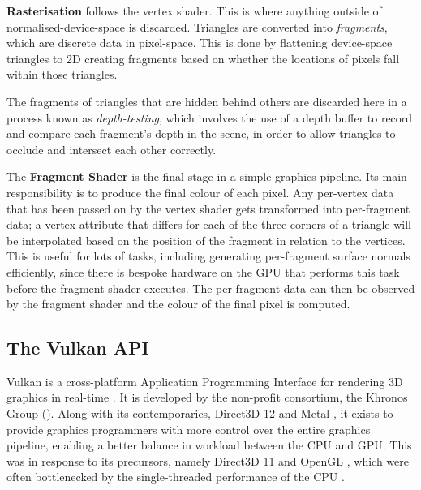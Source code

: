 \documentclass[11pt, a4paper, twocolumn]{article}
\begin{document}
\textbf{Rasterisation} follows the vertex shader. This is where anything outside of normalised-device-space is discarded. Triangles are converted into \emph{fragments}, which are discrete data in pixel-space. This is done by flattening device-space triangles to 2D creating fragments based on whether the locations of pixels fall within those triangles.

The fragments of triangles that are hidden behind others are discarded here in a process known as \emph{depth-testing}, which involves the use of a depth buffer to record and compare each fragment's depth in the scene, in order to allow triangles to occlude and intersect each other correctly.

The \textbf{Fragment Shader} is the final stage in a simple graphics pipeline. Its main responsibility is to produce the final colour of each pixel. Any per-vertex data that has been passed on by the vertex shader gets transformed into per-fragment data; a vertex attribute that differs for each of the three corners of a triangle will be interpolated based on the position of the fragment in relation to the vertices. This is useful for lots of tasks, including generating per-fragment surface normals efficiently, since there is bespoke hardware on the GPU that performs this task before the fragment shader executes. The per-fragment data can then be observed by the fragment shader and the colour of the final pixel is computed.


\subsection{The Vulkan API}

Vulkan is a cross-platform Application Programming Interface for rendering 3D graphics in real-time \citep{Vulkan}. It is developed by the non-profit consortium, the Khronos Group (\citeyear{Khronos}). Along with its contemporaries, Direct3D 12 \citep{d3D12} and Metal \citep{AppleMetal}, it exists to provide graphics programmers with more control over the entire graphics pipeline, enabling a better balance in workload between the CPU and GPU. This was in response to its precursors, namely Direct3D 11 \citep{d3D11} and OpenGL \citep{OpenGLDocs}, which were often bottlenecked by the single-threaded performance of the CPU \citep{Joseph2016}.

\end{document}

